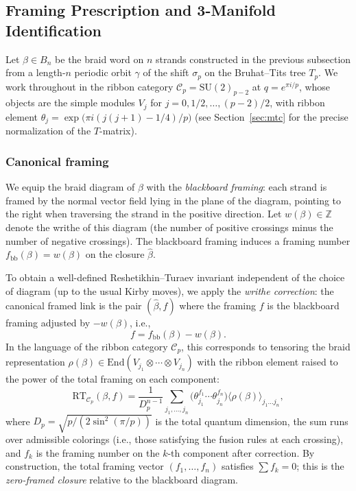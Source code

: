 \subsection{Framing Prescription and 3-Manifold Identification}

Let \(\beta \in B_n\) be the braid word on \(n\) strands constructed in the previous subsection from a length-\(n\) periodic orbit \(\gamma\) of the shift \(\sigma_p\) on the Bruhat--Tits tree \(T_p\). We work throughout in the ribbon category \(\mathcal{C}_p = \mathrm{SU}(2)_{p-2}\) at \(q = e^{\pi i / p}\), whose objects are the simple modules \(V_j\) for \(j = 0, 1/2, \dots, (p-2)/2\), with ribbon element \(\theta_j = \exp\bigl(\pi i (j(j+1) - 1/4)/p\bigr)\) (see Section~\ref{sec:mtc} for the precise normalization of the \(T\)-matrix).

\subsubsection{Canonical framing}

We equip the braid diagram of \(\beta\) with the \emph{blackboard framing}: each strand is framed by the normal vector field lying in the plane of the diagram, pointing to the right when traversing the strand in the positive direction. Let \(w(\beta) \in \mathbb{Z}\) denote the writhe of this diagram (the number of positive crossings minus the number of negative crossings). The blackboard framing induces a framing number \(f_{\mathrm{bb}}(\beta) = w(\beta)\) on the closure \(\widehat{\beta}\).

To obtain a well-defined Reshetikhin--Turaev invariant independent of the choice of diagram (up to the usual Kirby moves), we apply the \emph{writhe correction}: the canonical framed link is the pair \((\widehat{\beta}, f)\) where the framing \(f\) is the blackboard framing adjusted by \(-w(\beta)\), i.e.,
\[
f = f_{\mathrm{bb}}(\beta) - w(\beta).
\]
In the language of the ribbon category \(\mathcal{C}_p\), this corresponds to tensoring the braid representation \(\rho(\beta) \in \mathrm{End}(V_{j_1} \otimes \cdots \otimes V_{j_n})\) with the ribbon element raised to the power of the total framing on each component:
\[
\mathrm{RT}_{\mathcal{C}_p}(\beta, f) = \frac{1}{D_p^{n-1}} \sum_{j_1,\dots,j_n} \bigl( \theta_{j_1}^{f_1} \cdots \theta_{j_n}^{f_n} \bigr) \langle \rho(\beta) \rangle_{j_1 \dots j_n},
\]
where \(D_p = \sqrt{p / (2 \sin^2(\pi/p))}\) is the total quantum dimension, the sum runs over admissible colorings (i.e., those satisfying the fusion rules at each crossing), and \(f_k\) is the framing number on the \(k\)-th component after correction. By construction, the total framing vector \((f_1, \dots, f_n)\) satisfies \(\sum f_k = 0\); this is the \emph{zero-framed closure} relative to the blackboard diagram.

